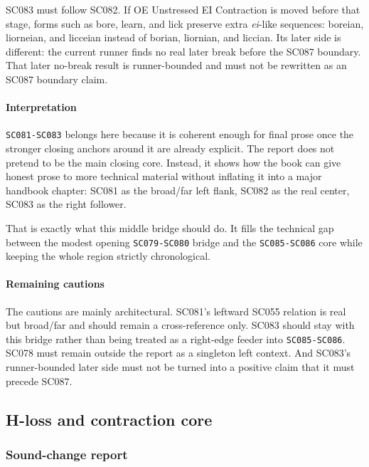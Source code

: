 \documentclass[
  british,
  a4paper,
]{article}
\begin{document}
SC083 must follow SC082. If OE Unstressed EI Contraction is moved before
that stage, forms such as bore, learn, and lick preserve extra
\emph{ei}-like sequences: boreian, liorneian, and licceian instead of
borian, liornian, and liccian. Its later side is different: the current
runner finds no real later break before the SC087 boundary. That later
no-break result is runner-bounded and must not be rewritten as an SC087
boundary claim.

\paragraph{Interpretation}\label{interpretation-50}

\texttt{SC081-SC083} belongs here because it is coherent enough for
final prose once the stronger closing anchors around it are already
explicit. The report does not pretend to be the main closing core.
Instead, it shows how the book can give honest prose to more technical
material without inflating it into a major handbook chapter: SC081 as
the broad/far left flank, SC082 as the real center, SC083 as the right
follower.

That is exactly what this middle bridge should do. It fills the
technical gap between the modest opening \texttt{SC079-SC080} bridge and
the \texttt{SC085-SC086} core while keeping the whole region strictly
chronological.

\paragraph{Remaining cautions}\label{remaining-cautions-50}

The cautions are mainly architectural. SC081's leftward SC055 relation
is real but broad/far and should remain a cross-reference only. SC083
should stay with this bridge rather than being treated as a right-edge
feeder into \texttt{SC085-SC086}. SC078 must remain outside the report
as a singleton left context. And SC083's runner-bounded later side must
not be turned into a positive claim that it must precede SC087.

\subsection{H-loss and contraction
core}\label{h-loss-and-contraction-core}

\subsubsection{Sound-change report}\label{sound-change-report-51}
\end{document}
